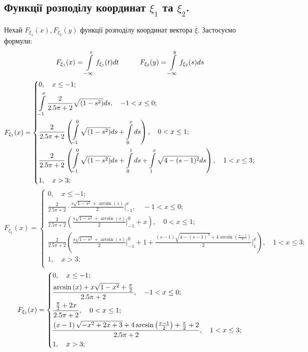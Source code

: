 \documentclass[14pt,a4paper]{scrartcl}
\theoremstyle{definition}
\theoremstyle{remark}
\theoremstyle{definition}
\theoremstyle{definition}
\begin{document}
\subsection{Функції розподілу координат $\xi_1$ та $\xi_2$.}
Нехай $F_{\xi_1}(x), F_{\xi_2}(y)$ функції розподілу координат вектора $\overline{\xi}$. Застосуємо формули:
$$
F_{\xi_1} (x) =  \int\limits_{-\infty}^{ x}{f_{\xi_1}(t)dt}\qquad\quad
F_{\xi_2}(y) =  \int\limits_{-\infty}^{ y}{ f_{\xi_2}(s)ds}
$$
\vfill
$$
F_{\xi_1} (x) = \begin{dcases}
0, \quad x \leq -1 ;\\
	  \int\limits_{-1}^{ x}\dfrac{2}{2.5\pi + 2} \sqrt{(1-s^2)}ds , \quad -1 < x \leq 0; \\
	\dfrac{2}{2.5\pi + 2} \left( \int\limits_{-1}^{ 0} \sqrt{(1-s^2)}ds +  \int\limits_{0}^{ x}{ds} \right)  , \quad 0 < x \leq 1; \\
	\dfrac{2}{2.5\pi + 2} \left( \int\limits_{-1}^{ 0} \sqrt{(1-s^2)}ds +  \int\limits_{0}^{ 1}{ds}  +  \int\limits_{1}^{ x}{\sqrt{4 - (s-1)^2}ds} \right)  , \quad 1 < x \leq 3; \\
	1, \quad x > 3 ;\\
\end{dcases}
$$
\vfill
$$
F_{\xi_1} (x) = \begin{cases}
0, \quad x \leq -1 ;\\
	  \frac{2}{2.5\pi + 2} \cdot \frac{ s\sqrt{1 - s^2} +\arcsin{\left( s  \right) }}{2}\Big|_{-1}^{x} , \quad -1 < x \leq 0; \\
	\frac{2}{2.5\pi + 2} \left( \frac{ s\sqrt{1 - s^2} +\arcsin{\left( s  \right) }}{2}\Big|_{-1}^{0} +  x \right)  , \quad 0 < x \leq 1; \\
	\frac{2}{2.5\pi + 2} \left( \frac{ s\sqrt{1 - s^2} +\arcsin{\left( s  \right) }}{2}\Big|_{-1}^{0} +  1 +
	\frac{ (s-1)\sqrt{4 - (s-1)^2} +4\arcsin{\left( \frac{s-1}{2}  \right) }}{2}\Big|_{1}^{x} \right)  , \quad 1 < x \leq 3; \\
	1, \quad x > 3 ;\\
\end{cases}
$$
\vfill
$$
F_{\xi_1} (x) = \begin{dcases}
0, \quad x \leq -1 ;\\
	  \dfrac{\arcsin\left(x\right)+x\sqrt{1-x^2}+\frac{{\pi}}{2} }{2.5\pi + 2} , \quad -1 < x \leq 0; \\
	\dfrac{\frac{{\pi}}{2} +  2x }{2.5\pi + 2} , \quad 0 < x \leq 1; \\
	\dfrac{\left(x-1\right)\sqrt{-x^2+2x+3}+4\arcsin\left(\frac{x-1}{2}\right) + \frac{\pi}{2}+2 }{2.5\pi + 2} , \quad 1 < x \leq 3; \\
	1, \quad x > 3 ;\\
\end{dcases}
$$
\vfill
\end{document}
